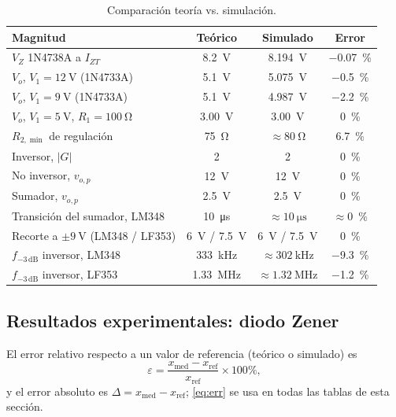 \documentclass[9pt, conference]{IEEEtran}
\newcommand{\qV}[1]{\SI{#1}{\volt}}
\newcommand{\qohm}[1]{\SI{#1}{\ohm}}
\newcommand{\pct}[1]{\SI{#1}{\percent}}
\begin{document}
\begin{table}[htbp]
\centering
\caption{Comparación teoría vs. simulación.}
\label{tab:teo_sim}
\footnotesize
\setlength{\tabcolsep}{3pt}
\begin{tabular}{@{}lccc@{}}
\toprule
Magnitud & Teórico & Simulado & Error \\
\midrule
$V_Z$ 1N4738A a $I_{ZT}$ & \qV{8.2} & \qV{8.194} & \pct{-0.07} \\
$V_o$, $V_1=\qV{12}$ (1N4733A) & \qV{5.1} & \qV{5.075} & \pct{-0.5} \\
$V_o$, $V_1=\qV{9}$ (1N4733A) & \qV{5.1} & \qV{4.987} & \pct{-2.2} \\
$V_o$, $V_1=\qV{5}$, $R_1=\qohm{100}$ & \qV{3.00} & \qV{3.00} & \pct{0} \\
$R_{2,\min}$ de regulación & \qohm{75} & $\approx\qohm{80}$ & \pct{+6.7} \\
Inversor, $|G|$ & 2 & 2 & \pct{0} \\
No inversor, $v_{o,p}$ & \qV{12} & \qV{12} & \pct{0} \\
Sumador, $v_{o,p}$ & \qV{2.5} & \qV{2.5} & \pct{0} \\
Transición del sumador, LM348 & \SI{10}{\micro\second} & $\approx\SI{10}{\micro\second}$ & $\approx$\pct{0} \\
Recorte a $\pm\qV{9}$ (LM348 / LF353) & \qV{6} / \qV{7.5} & \qV{6} / \qV{7.5} & \pct{0} \\
$f_{-3\,\mathrm{dB}}$ inversor, LM348 & \SI{333}{\kilo\hertz} & $\approx\SI{302}{\kilo\hertz}$ & \pct{-9.3} \\
$f_{-3\,\mathrm{dB}}$ inversor, LF353 & \SI{1.33}{\mega\hertz} & $\approx\SI{1.32}{\mega\hertz}$ & \pct{-1.2} \\
\bottomrule
\end{tabular}
\end{table}

\subsection{Resultados experimentales: diodo Zener}
El error relativo respecto a un valor de referencia (teórico o simulado) es
\begin{equation}
\varepsilon=\frac{x_{\mathrm{med}}-x_{\mathrm{ref}}}{x_{\mathrm{ref}}}\times100\%,
\label{eq:err}
\end{equation}
y el error absoluto es $\Delta=x_{\mathrm{med}}-x_{\mathrm{ref}}$; \eqref{eq:err} se usa en todas las tablas de esta sección.
\end{document}
